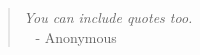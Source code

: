 \clearpage
\vspace*{3cm}

\begin{center}
\begin{minipage}{.8\textwidth}
\begin{quote}
\singlespacing
\emph{ You can include quotes too. }\\
\mbox{}~ \hfill{} {\footnotesize - Anonymous}
\end{quote}


\end{minipage}
\end{center}
\cleardoublepage
